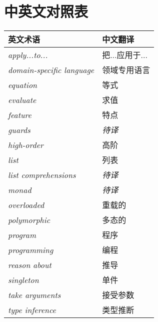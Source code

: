 \chapter*{中英文对照表}

\begin{table}[htbp]
\label{tab:threesome}
\centering
\begin{tabular}{ll}
\hline
英文术语 & 中文翻译 \\
\hline
\textit{apply...to...} & 把...应用于...\\
\textit{domain-specific language} & 领域专用语言 \\
\textit{equation} & 等式 \\
\textit{evaluate} & 求值 \\
\textit{feature} & 特点 \\
\textit{guards} & \textit{待译} \\
\textit{high-order} & 高阶 \\
\textit{list} & 列表 \\
\textit{list comprehensions} & \textit{待译}\\
\textit{monad} & \textit{待译} \\
\textit{overloaded} & 重载的 \\
\textit{polymorphic} & 多态的 \\
\textit{program} & 程序 \\
\textit{programming} & 编程 \\
\textit{reason about} & 推导 \\
\textit{singleton} & 单件 \\
\textit{take arguments} & 接受参数 \\
\textit{type inference} & 类型推断 \\

\hline
\end{tabular}
\end{table}

